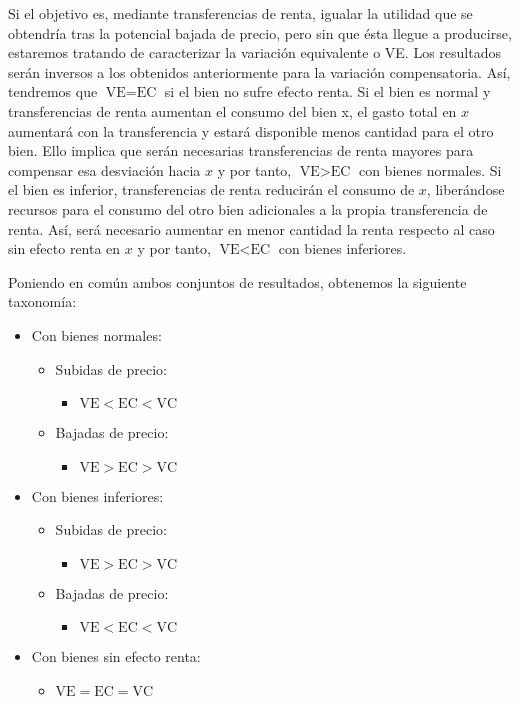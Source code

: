 \documentclass{nuevotema}
\begin{document}
Si el objetivo es, mediante transferencias de renta, igualar la utilidad que se obtendría tras la potencial bajada de precio, pero sin que ésta llegue a producirse, estaremos tratando de caracterizar la variación equivalente o VE. Los resultados serán inversos a los obtenidos anteriormente para la variación compensatoria. Así, tendremos que $\text{VE} = \text{EC}$ si el bien no sufre efecto renta. Si el bien es normal y transferencias de renta aumentan el consumo del bien x, el gasto total en $x$ aumentará con la transferencia y estará disponible menos cantidad para el otro bien. Ello implica que serán necesarias transferencias de renta mayores para compensar esa desviación hacia $x$ y por tanto, $\text{VE} > \text{EC}$ con bienes normales. Si el bien es inferior, transferencias de renta reducirán el consumo de $x$, liberándose recursos para el consumo del otro bien adicionales a la propia transferencia de renta. Así, será necesario aumentar en menor cantidad la renta respecto al caso sin efecto renta en $x$ y por tanto, $\text{VE} < \text{EC}$ con bienes inferiores.

Poniendo en común ambos conjuntos de resultados, obtenemos la siguiente taxonomía:

\begin{itemize}
	\item Con bienes normales:
	\begin{itemize}
		\item Subidas de precio:
		\begin{itemize}
			\item $\text{VE} < \text{EC} < \text{VC}$
		\end{itemize}
		\item Bajadas de precio:
		\begin{itemize}
			\item $\text{VE} > \text{EC} > \text{VC}$
		\end{itemize}
	\end{itemize}
	\item Con bienes inferiores:
	\begin{itemize}
		\item Subidas de precio:
		\begin{itemize}
			\item $\text{VE} > \text{EC} > \text{VC}$
		\end{itemize}
		\item Bajadas de precio:
		\begin{itemize}
			\item  $\text{VE} < \text{EC} < \text{VC}$
		\end{itemize}
	\end{itemize}
	\item Con bienes sin efecto renta:
	\begin{itemize}
		\item $\text{VE} = \text{EC} = \text{VC}$
	\end{itemize}
\end{itemize}
\end{document}

